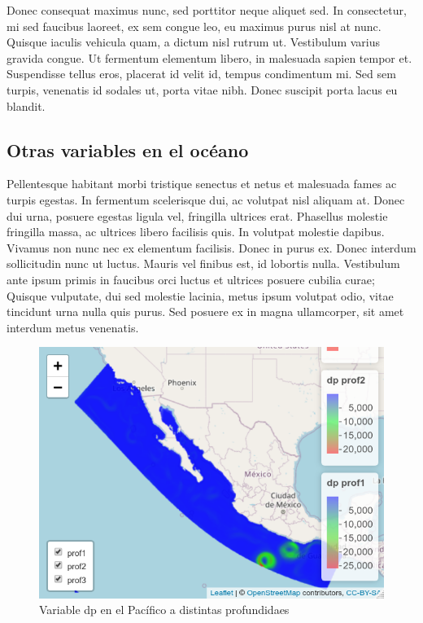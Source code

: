 \documentclass[
]{article}
\begin{document}
Donec consequat maximus nunc, sed porttitor neque aliquet sed. In consectetur, mi sed faucibus laoreet, ex sem congue leo, eu maximus purus nisl at nunc. Quisque iaculis vehicula quam, a dictum nisl rutrum ut. Vestibulum varius gravida congue. Ut fermentum elementum libero, in malesuada sapien tempor et. Suspendisse tellus eros, placerat id velit id, tempus condimentum mi. Sed sem turpis, venenatis id sodales ut, porta vitae nibh. Donec suscipit porta lacus eu blandit.

\hypertarget{otras-variables-en-el-ocuxe9ano}{%
\subsection{Otras variables en el océano}\label{otras-variables-en-el-ocuxe9ano}}

Pellentesque habitant morbi tristique senectus et netus et malesuada fames ac turpis egestas. In fermentum scelerisque dui, ac volutpat nisl aliquam at. Donec dui urna, posuere egestas ligula vel, fringilla ultrices erat. Phasellus molestie fringilla massa, ac ultrices libero facilisis quis. In volutpat molestie dapibus. Vivamus non nunc nec ex elementum facilisis. Donec in purus ex. Donec interdum sollicitudin nunc ut luctus. Mauris vel finibus est, id lobortis nulla. Vestibulum ante ipsum primis in faucibus orci luctus et ultrices posuere cubilia curae; Quisque vulputate, dui sed molestie lacinia, metus ipsum volutpat odio, vitae tincidunt urna nulla quis purus. Sed posuere ex in magna ullamcorper, sit amet interdum metus venenatis.

\begin{figure}
\includegraphics[width=0.95\linewidth]{images/dp01} \caption{Variable dp en el Pacífico a distintas profundidaes}\label{fig:Mapa02}
\end{figure}
\end{document}
